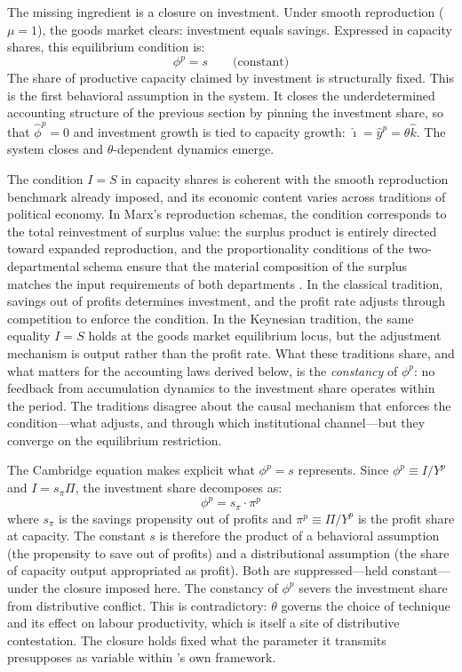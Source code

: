 The missing ingredient is a closure on investment. Under smooth reproduction ($\mu = 1$), the goods market clears: investment equals savings. Expressed in capacity shares, this equilibrium condition is:
%
\begin{equation}\label{eq:IS_closure}
	\phi^p = s \qquad \text{(constant)}
\end{equation}
%
The share of productive capacity claimed by investment is structurally fixed. This is the first behavioral assumption in the system. It closes the underdetermined accounting structure of the previous section by pinning the investment share, so that $\hat{\phi}^p = 0$ and investment growth is tied to capacity growth: $\hat{\imath} = \hat{y}^p = \theta\hat{k}$. The system closes and $\theta$-dependent dynamics emerge.

The condition $I = S$ in capacity shares is coherent with the smooth reproduction benchmark already imposed, and its economic content varies across traditions of political economy. In Marx's reproduction schemas, the condition corresponds to the total reinvestment of surplus value: the surplus product is entirely directed toward expanded reproduction, and the proportionality conditions of the two-departmental schema ensure that the material composition of the surplus matches the input requirements of both departments \citep{MarxKVII}. In the classical tradition, savings out of profits determines investment, and the profit rate adjusts through competition to enforce the condition. In the Keynesian tradition, the same equality $I = S$ holds at the goods market equilibrium locus, but the adjustment mechanism is output rather than the profit rate. What these traditions share, and what matters for the accounting laws derived below, is the \emph{constancy} of $\phi^p$: no feedback from accumulation dynamics to the investment share operates within the period. The traditions disagree about the causal mechanism that enforces the condition---what adjusts, and through which institutional channel---but they converge on the equilibrium restriction.

The Cambridge equation makes explicit what $\phi^p = s$ represents. Since $\phi^p \equiv I/Y^p$ and $I = s_\pi \Pi$, the investment share decomposes as:
%
\begin{equation}\label{eq:cambridge}
	\phi^p = s_\pi \cdot \pi^p
\end{equation}
%
where $s_\pi$ is the savings propensity out of profits and $\pi^p \equiv \Pi/Y^p$ is the profit share at capacity. The constant $s$ is therefore the product of a behavioral assumption (the propensity to save out of profits) and a distributional assumption (the share of capacity output appropriated as profit). Both are suppressed---held constant---under the closure imposed here. The constancy of $\phi^p$ severs the investment share from distributive conflict. This is contradictory: $\theta$ governs the choice of technique and its effect on labour productivity, which is itself a site of distributive contestation. The closure holds fixed what the parameter it transmits presupposes as variable within \citet{Shaikh2016}'s own framework.


